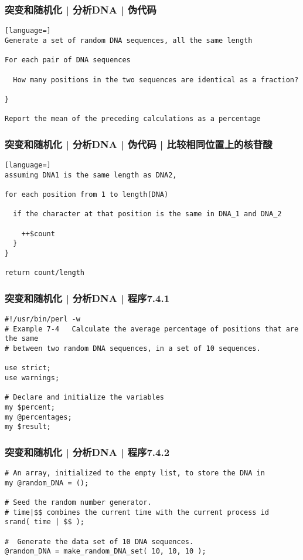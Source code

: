 \begin{frame}[fragile]
  \frametitle{突变和随机化 | 分析DNA | 伪代码}
\begin{lstlisting}[language=]
Generate a set of random DNA sequences, all the same length

For each pair of DNA sequences

  How many positions in the two sequences are identical as a fraction?

}

Report the mean of the preceding calculations as a percentage
\end{lstlisting}
\end{frame}

\begin{frame}[fragile]
  \frametitle{突变和随机化 | 分析DNA | 伪代码 | 比较相同位置上的核苷酸}
\begin{lstlisting}[language=]
assuming DNA1 is the same length as DNA2,

for each position from 1 to length(DNA)

  if the character at that position is the same in DNA_1 and DNA_2

    ++$count
  }
}

return count/length
\end{lstlisting}
\end{frame}

\begin{frame}[fragile]
  \frametitle{突变和随机化 | 分析DNA | 程序7.4.1}
\begin{lstlisting}[firstnumber=1]
#!/usr/bin/perl -w
# Example 7-4   Calculate the average percentage of positions that are the same
# between two random DNA sequences, in a set of 10 sequences.

use strict;
use warnings;

# Declare and initialize the variables
my $percent;
my @percentages;
my $result;
\end{lstlisting}
\end{frame}

\begin{frame}[fragile]
  \frametitle{突变和随机化 | 分析DNA | 程序7.4.2}
\begin{lstlisting}[firstnumber=13]
# An array, initialized to the empty list, to store the DNA in
my @random_DNA = ();

# Seed the random number generator.
# time|$$ combines the current time with the current process id
srand( time | $$ );

#  Generate the data set of 10 DNA sequences.
@random_DNA = make_random_DNA_set( 10, 10, 10 );
\end{lstlisting}
\end{frame}

